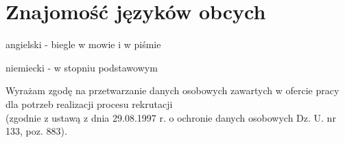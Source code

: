 \documentclass[letterpaper]{article}
\renewenvironment{itemize}{
  \begin{list}{}{
    \setlength{\leftmargin}{1.5em}
  }
}{
  \end{list}
}
\begin{document}
\section*{Znajomość języków obcych}

\begin{itemize}
\item angielski - biegle w mowie i w piśmie
\item niemiecki - w stopniu podstawowym
\end{itemize}


\vfill

\begin{center}
  \begin{footnotesize}
    Wyrażam zgodę na przetwarzanie danych osobowych zawartych w ofercie pracy dla potrzeb realizacji procesu rekrutacji\\
    (zgodnie z ustawą z dnia 29.08.1997 r. o ochronie danych osobowych Dz. U. nr 133, poz. 883).
  \end{footnotesize}
\end{center}
\end{document}
